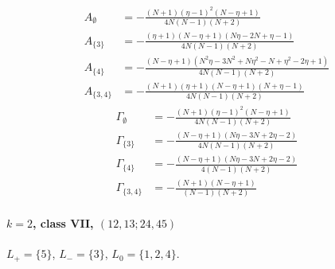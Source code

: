 \documentclass[11pt]{article}
\begin{document}
\begin{align*}
  A_{\emptyset} &= - \frac{\left(N + 1\right) \left(\eta - 1\right)^{2} \left(N - \eta + 1\right)}{4 N \left(N - 1\right) \left(N + 2\right)} \\
  A_{\{3\}} &= - \frac{\left(\eta + 1\right) \left(N - \eta + 1\right) \left(N \eta - 2 N + \eta - 1\right)}{4 N \left(N - 1\right) \left(N + 2\right)} \\
  A_{\{4\}} &= - \frac{\left(N - \eta + 1\right) \left(N^{2} \eta - 3 N^{2} + N \eta^{2} - N + \eta^{2} - 2 \eta + 1\right)}{4 N \left(N - 1\right) \left(N + 2\right)} \\
  A_{\{3,4\}} &= - \frac{\left(N + 1\right) \left(\eta + 1\right) \left(N - \eta + 1\right) \left(N + \eta - 1\right)}{4 N \left(N - 1\right) \left(N + 2\right)} 
\end{align*}
\begin{align*}
  \Gamma_{\emptyset} &= - \frac{\left(N + 1\right) \left(\eta - 1\right)^{2} \left(N - \eta + 1\right)}{4 N \left(N - 1\right) \left(N + 2\right)} \\
  \Gamma_{\{3\}} &= - \frac{\left(N - \eta + 1\right) \left(N \eta - 3 N + 2 \eta - 2\right)}{4 N \left(N - 1\right) \left(N + 2\right)} \\
  \Gamma_{\{4\}} &= - \frac{\left(N - \eta + 1\right) \left(N \eta - 3 N + 2 \eta - 2\right)}{4 \left(N - 1\right) \left(N + 2\right)} \\
  \Gamma_{\{3,4\}} &= - \frac{\left(N + 1\right) \left(N - \eta + 1\right)}{\left(N - 1\right) \left(N + 2\right)} 
\end{align*}

\paragraph{$k=2$, class VII, $(12,13;24,45)$}

$L_+=\{5\}$, $L_-=\{3\}$, $L_0=\{1,2,4\}$.
\end{document}
